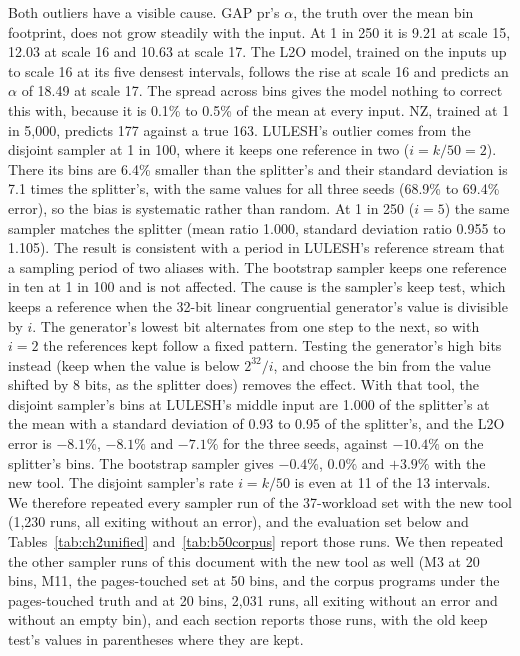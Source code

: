 \documentclass[11pt]{article}
\begin{document}
Both outliers have a visible cause. GAP pr's $\alpha$, the truth over the mean bin footprint, does not grow
steadily with the input. At 1 in 250 it is 9.21 at scale 15, 12.03 at scale 16 and 10.63 at scale 17. The L2O
model, trained on the inputs up to scale 16 at its five densest intervals, follows the rise at scale 16 and
predicts an $\alpha$ of 18.49 at scale 17. The spread across bins gives the model nothing to correct this with,
because it is 0.1\% to 0.5\% of the mean at every input. NZ, trained at 1 in 5,000, predicts 177 against a true
163. LULESH's outlier comes from the disjoint sampler at 1 in 100, where it keeps one reference in two
($i = k/50 = 2$). There its bins are 6.4\% smaller than the splitter's and their standard deviation is 7.1 times
the splitter's, with the same values for all three seeds (68.9\% to 69.4\% error), so the bias is systematic
rather than random. At 1 in 250 ($i = 5$) the same sampler matches the splitter (mean ratio 1.000, standard
deviation ratio 0.955 to 1.105). The result is consistent with a period in LULESH's reference stream that a
sampling period of two aliases with. The bootstrap sampler keeps one reference in ten at 1 in 100 and is not
affected. The cause is the sampler's keep test, which keeps a reference when the 32-bit linear congruential
generator's value is divisible by $i$. The generator's lowest bit alternates from one step to the next, so with
$i = 2$ the references kept follow a fixed pattern. Testing the generator's high bits instead (keep when the value is
below $2^{32}/i$, and choose the bin from the value shifted by 8 bits, as the splitter does) removes the effect. With
that tool, the disjoint sampler's bins at LULESH's middle input are 1.000 of the splitter's at the mean with a standard
deviation of 0.93 to 0.95 of the splitter's, and the L2O error is $-8.1\%$, $-8.1\%$ and $-7.1\%$ for the three seeds,
against $-10.4\%$ on the splitter's bins. The bootstrap sampler gives $-0.4\%$, $0.0\%$ and $+3.9\%$ with the new tool.
The disjoint sampler's rate $i = k/50$ is even at 11 of the 13 intervals. We therefore repeated every sampler run
of the 37-workload set with the new tool (1{,}230 runs, all exiting without an error), and the evaluation set below
and Tables~\ref{tab:ch2unified} and~\ref{tab:b50corpus} report those runs. We then repeated the other sampler
runs of this document with the new tool as well (M3 at 20 bins, M11, the pages-touched set at 50 bins, and the corpus
programs under the pages-touched truth and at 20 bins, 2{,}031 runs, all exiting without an error and without an empty
bin), and each section reports those runs, with the old keep test's values in parentheses where they are kept.
\end{document}
